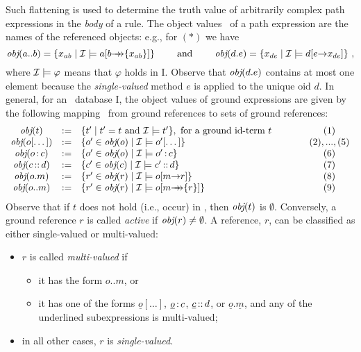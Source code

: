\documentclass[11pt]{report}
\begin{document}
Such flattening is used to determine the truth value of
arbitrarily complex path expressions in the \emph{body} of a rule.
The object values \obj\ of a path expression are
the names of the referenced objects: e.g., for $(*)$ we have
\begin{displaymath}
\textit{obj}(a..b) = \{x_{ab} \mid \mathcal{I} \models a[b{\rightarrow\!\!\!\!\rightarrow}\{x_{ab}\}]\}
\qquad\textrm{ and }\qquad \textit{obj}(d.e) = \{x_{de} \mid \mathcal{I} \models d[e{\rightarrow} 
x_{de}]\} ~,
\end{displaymath}
%
where $\mathcal{I} \models \varphi$ means that $\varphi$ holds in \db I.
Observe that $\textit{obj}(d.e)$ contains at most one element because the
\emph{single-valued} method $e$ is applied to the unique oid $d$.  In
general, for an \fl\ database \db I, the object values of ground
expressions are given by the following mapping \obj\ from ground
references to sets of ground references:
%
\begin{displaymath}
  \begin{array}{cll@{\hspace{4em}}c}
    \obj(t) & := & \{t' \mid t'=t \textrm{ and } \db I\models t' \}, 
     \textrm{ for a ground id-term $t$}  & (1) \\   
    \obj(o[\dots]) & :=& \{o'\in\obj(o) \mid \db I \models o'[\dots]
    \}& (2),...,(5)\\  
    \obj(o\isa c) & := & \{o'\in\obj(o) \mid \db I \models o'\isa c\} &
    (6) \\ 
    \obj(c\subcl d) & := & \{c'\in\obj(c) \mid \db I \models c'\subcl
    d\} &  (7)\\ 
    \obj(o.m) & :=  & \{r'\in\obj(r) \mid \db I \models o[m\fd
    r]\}  &  (8)\\ 
    \obj(o..m) & := &  \{ r'\in\obj(r) \mid \db I \models
    o[m{\mvd}\{r\}] \} & (9)   
  \end{array}
\end{displaymath}
Observe that if $t$ does not hold (i.e., occur) in , then $\textit{obj}(t)$ is
$\emptyset$.  Conversely, a ground reference $r$ is called \emph{active} if
$\textit{obj}(r)\neq\emptyset$. A reference, $r$, can be classified as either
single-valued or multi-valued:
\begin{itemize}
\item $r$ is called \emph{multi-valued} if
 \begin{itemize}
  \item it has the form $o..m$, or 
  \item it has one of the forms $\underline{o}[\dots]$,
    $\underline{o}\,{\bf{:}}\, c$, $\underline{c}\,{\bf{::}}\, d$, or
    $\underline{o}.\underline{m}$, and any of the underlined
    subexpressions is multi-valued;
 \end{itemize}
\item in all other cases, $r$ is \emph{single-valued}.
\end{itemize}
\end{document}
